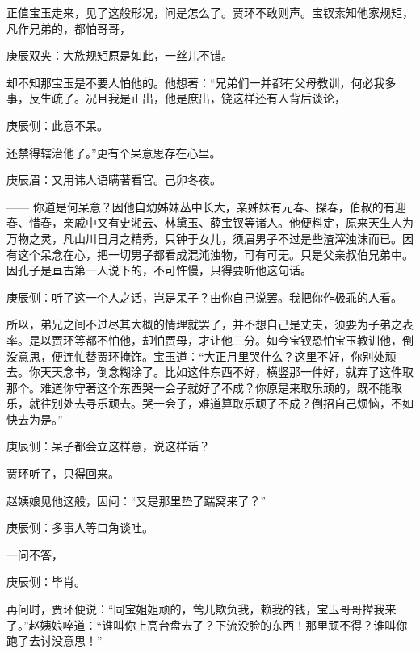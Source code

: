 \begin{parag}
    正值宝玉走来，见了这般形况，问是怎么了。贾环不敢则声。宝钗素知他家规矩，凡作兄弟的，都怕哥哥，\begin{note}庚辰双夹：大族规矩原是如此，一丝儿不错。\end{note}却不知那宝玉是不要人怕他的。他想著：“兄弟们一并都有父母教训，何必我多事，反生疏了。况且我是正出，他是庶出，饶这样还有人背后谈论，\begin{note}庚辰侧：此意不呆。\end{note}还禁得辖治他了。”更有个呆意思存在心里。\begin{note}庚辰眉：又用讳人语瞒著看官。己卯冬夜。\end{note}—— 你道是何呆意？因他自幼姊妹丛中长大，亲姊妹有元春、探春，伯叔的有迎春、惜春，亲戚中又有史湘云、林黛玉、薛宝钗等诸人。他便料定，原来天生人为万物之灵，凡山川日月之精秀，只钟于女儿，须眉男子不过是些渣滓浊沫而已。因有这个呆念在心，把一切男子都看成混沌浊物，可有可无。只是父亲叔伯兄弟中。因孔子是亘古第一人说下的，不可忤慢，只得要听他这句话。\begin{note}庚辰侧：听了这一个人之话，岂是呆子？由你自己说罢。我把你作极乖的人看。\end{note}所以，弟兄之间不过尽其大概的情理就罢了，并不想自己是丈夫，须要为子弟之表率。是以贾环等都不怕他，却怕贾母，才让他三分。如今宝钗恐怕宝玉教训他，倒没意思，便连忙替贾环掩饰。宝玉道：“大正月里哭什么？这里不好，你别处顽去。你天天念书，倒念糊涂了。比如这件东西不好，横竖那一件好，就弃了这件取那个。难道你守著这个东西哭一会子就好了不成？你原是来取乐顽的，既不能取乐，就往别处去寻乐顽去。哭一会子，难道算取乐顽了不成？倒招自己烦恼，不如快去为是。”\begin{note}庚辰侧：呆子都会立这样意，说这样话？\end{note}贾环听了，只得回来。
\end{parag}


\begin{parag}
    赵姨娘见他这般，因问：“又是那里垫了踹窝来了？”\begin{note}庚辰侧：多事人等口角谈吐。\end{note}一问不答，\begin{note}庚辰侧：毕肖。\end{note}再问时，贾环便说：“同宝姐姐顽的，莺儿欺负我，赖我的钱，宝玉哥哥撵我来了。”赵姨娘啐道：“谁叫你上高台盘去了？下流没脸的东西！那里顽不得？谁叫你跑了去讨没意思！”
\end{parag}


